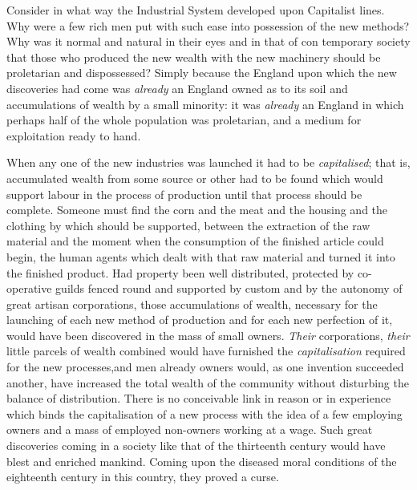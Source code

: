 \documentclass{book}
\begin{document}
Consider in what way the Industrial System developed upon Capitalist lines. Why were a few rich men put with such ease into possession of the new methods? Why was it normal and natural in their eyes and in that of con temporary society that those who produced the new wealth with the new machinery should be proletarian and dispossessed? Simply because the England upon which the new discoveries had come was \emph{already} an England owned as to its soil and accumulations of wealth by a small minority: it was \emph{already} an England in which perhaps half of the whole population was proletarian, and a medium for exploitation ready to hand.

When any one of the new industries was launched it had to be \emph{capitalised}; that is, accumulated wealth from some source or other had to be found which would support labour in the process of production until that process should be complete. Someone must find the corn and the meat and the housing and the clothing by which should be supported, between the extraction of the raw material and the moment when the consumption of the finished article could begin, the human agents which dealt with that raw material and turned it into the finished product. Had property been well distributed, protected by co-operative guilds fenced round and supported by custom and by the autonomy of great artisan corporations, those accumulations of wealth, necessary for the launching of each new method of production and for each new perfection of it, would have been discovered in the mass of small owners. \emph{Their} corporations, \emph{their} little parcels of wealth combined would have furnished the \emph{capitalisation} required for the new processes,and men already owners would, as one invention succeeded another, have increased the total wealth of the community without disturbing the balance of distribution. There is no conceivable link in reason or in experience which binds the capitalisation of a new process with the idea of a few employing owners and a mass of employed non-owners working at a wage. Such great discoveries coming in a society like that of the thirteenth century would have blest and enriched mankind. Coming upon the diseased moral conditions of the eighteenth century in this country, they proved a curse.
\end{document}
